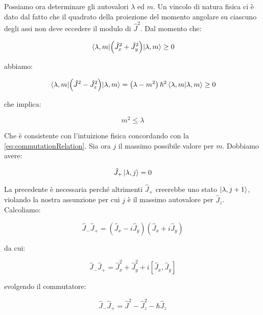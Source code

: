 Possiamo ora determinare gli autovalori $\lambda$ ed $m$. Un vincolo di natura fisica ci \`e dato dal fatto che il quadrato della proiezione del momento angolare su ciascuno degli assi non deve eccedere il modulo di $\hat{J}^2$. Dal momento che:

	\begin{equation}
		\mel{\lambda, m}{\left ( \hat{J}^2_x + \hat{J}^2_y \right )}{\lambda, m} \ge 0
	\end{equation}

abbiamo:

	\begin{equation}
		\mel{\lambda, m}{\left ( \hat{J}^2 - \hat{J}^2_z \right )}{\lambda, m} = \left ( \lambda - m^2 \right ) \hbar^2 \braket{\lambda, m}{\lambda, m} \ge 0
	\end{equation}

che implica:

	\begin{equation}
		m^2 \le \lambda
	\end{equation}

Che \`e consistente con l'intuizione fisica concordando con la \eqref{eq:commutationRelation}. Sia ora $j$ il massimo possibile valore per $m$. Dobbiamo avere:

	\begin{equation}
		\hat{J}_+ \ket{\lambda, j} = 0
	\end{equation}

La precedente \`e necessaria perch\'e altrimenti $\hat{J}_+$ creerebbe uno stato $\ket{\lambda, j+1}$, violando la nostra assunzione per cui $j$ \`e il massimo autovalore per $\hat{J}_z$. Calcoliamo:

	\begin{equation}
		\hat{J}_- \hat{J}_+ = \left ( \hat{J}_x - i \hat{J}_y \right ) \left ( \hat{J}_x + i \hat{J}_y \right )
	\end{equation}

da cui:

	\begin{equation}
		\hat{J}_- \hat{J}_+ = \hat{J}^2_x + \hat{J}^2_y + i \left [ \hat{J}_x, \hat{J}_y \right ]
	\end{equation}

svolgendo il commutatore:

	\begin{equation} \label{eq:raisLowComp}
		\hat{J}_- \hat{J}_+	= \hat{J}^2 - \hat{J}_z^2 - \hbar \hat{J}_z
	\end{equation}

